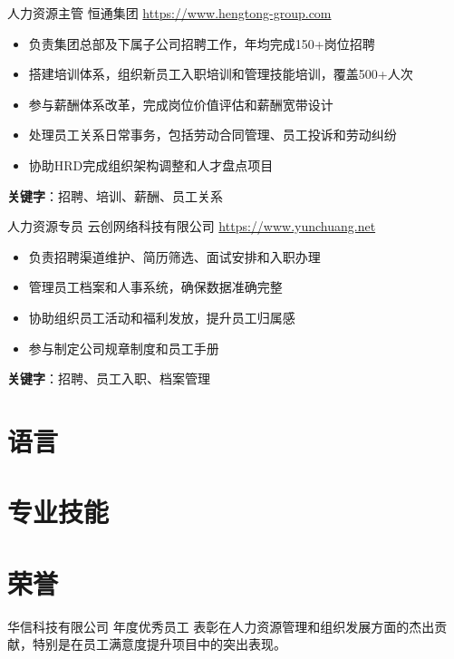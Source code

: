 \documentclass[a4paper, serif, 10pt]{moderncv}
\begin{document}
        {人力资源主管}
        {恒通集团}
        {\url{https://www.hengtong-group.com}}
        {}
        {\begin{itemize}
\item 负责集团总部及下属子公司招聘工作，年均完成150+岗位招聘
\item 搭建培训体系，组织新员工入职培训和管理技能培训，覆盖500+人次
\item 参与薪酬体系改革，完成岗位价值评估和薪酬宽带设计
\item 处理员工关系日常事务，包括劳动合同管理、员工投诉和劳动纠纷
\item 协助HRD完成组织架构调整和人才盘点项目
\end{itemize}
\textbf{关键字}：招聘、培训、薪酬、员工关系}

        {人力资源专员}
        {云创网络科技有限公司}
        {\url{https://www.yunchuang.net}}
        {}
        {\begin{itemize}
\item 负责招聘渠道维护、简历筛选、面试安排和入职办理
\item 管理员工档案和人事系统，确保数据准确完整
\item 协助组织员工活动和福利发放，提升员工归属感
\item 参与制定公司规章制度和员工手册
\end{itemize}
\textbf{关键字}：招聘、员工入职、档案管理}
\section{语言}

\section{专业技能}

\section{荣誉}

        {华信科技有限公司}
        {年度优秀员工}
        {}
        {}
        {表彰在人力资源管理和组织发展方面的杰出贡献，特别是在员工满意度提升项目中的突出表现。}
\end{document}
